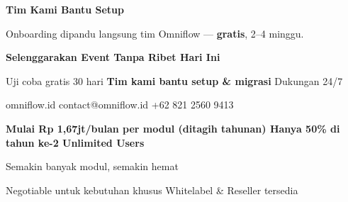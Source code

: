 \documentclass[a4paper]{article}
\begin{document}
\begin{center}
\begin{minipage}[t]{0.318\textwidth}
{\begin{minipage}[t][4.7cm][c]{\dimexpr\linewidth-2\fboxsep\relax}
            \vspace{2pt}
            \begin{center}
                {\fontsize{10}{13}\selectfont\bfseries\color{BlueDark} Tim Kami Bantu Setup}\par\vspace{3pt}
                {\fontsize{9}{12}\selectfont\color{TextDark} Onboarding dipandu langsung tim Omniflow --- \textbf{gratis}, 2--4 minggu.}
            \end{center}
        \end{minipage}}
\end{minipage}
\end{center}

\vspace{8pt}

{\setlength{\fboxsep}{10pt}\setlength{\fboxrule}{0pt}%
\noindent\colorbox{BluePrimary}{%
    \begin{minipage}{\dimexpr\textwidth-2\fboxsep\relax}
        \centering
        {\fontsize{13}{16}\selectfont\bfseries\color{White} Selenggarakan Event Tanpa Ribet Hari Ini}\par\vspace{3pt}
        {\fontsize{9.5}{12}\selectfont\color{BlueMid} Uji coba gratis 30 hari \enspace\textbullet\enspace \textbf{Tim kami bantu setup \& migrasi} \enspace\textbullet\enspace Dukungan 24/7}\par\vspace{2pt}
        {\fontsize{9.5}{12}\selectfont\color{BlueLight} omniflow.id \enspace\textbullet\enspace contact@omniflow.id \enspace\textbullet\enspace +62 821 2560 9413}
    \end{minipage}}}


\vspace{6pt}

{\setlength{\fboxsep}{8pt}\setlength{\fboxrule}{0pt}%
\noindent\colorbox{BlueBg}{%
    \begin{minipage}{\dimexpr\textwidth-2\fboxsep\relax}
        \centering
        {\fontsize{9}{12}\selectfont\bfseries\color{BluePrimary}
        Mulai Rp 1,67jt/bulan per modul (ditagih tahunan) \enspace\textbullet\enspace Hanya 50\% di tahun ke-2 \enspace\textbullet\enspace Unlimited Users}\par\vspace{1pt}
        {\fontsize{8.5}{11}\selectfont\color{BlueDark}
        Semakin banyak modul, semakin hemat}\par\vspace{1pt}
        {\fontsize{8}{10}\selectfont\color{TextLight}
        Negotiable untuk kebutuhan khusus \enspace\textbullet\enspace Whitelabel \& Reseller tersedia}
    \end{minipage}}}

\restoregeometry
\pagestyle{empty}
\end{document}
